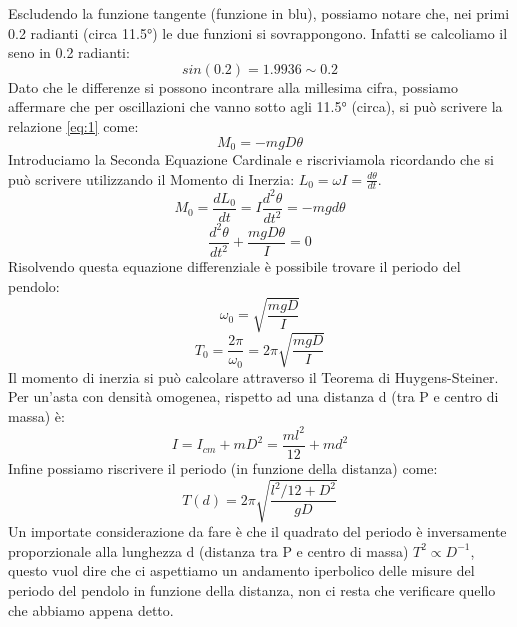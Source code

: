 \documentclass[a4paper]{article}
\begin{document}
        Escludendo la funzione tangente (funzione in blu), possiamo notare che, nei primi 0.2 radianti (circa 11.5°) le due funzioni si sovrappongono. Infatti se calcoliamo il seno in 0.2 radianti:
        \begin{equation*}
            sin(0.2) = 1.9936 \sim 0.2
        \end{equation*}
        Dato che le differenze si possono incontrare alla millesima cifra, possiamo affermare che per oscillazioni che vanno sotto agli 11.5° (circa), si può scrivere la relazione \ref{eq:1} come:
        \begin{equation*}
            M_0 = - m g D \theta
        \end{equation*}
        Introduciamo la Seconda Equazione Cardinale e riscriviamola ricordando che  si può scrivere utilizzando il Momento di Inerzia: $L_0 = \omega I = \frac{d\theta}{dt}$.
        \begin{equation*}
            M_0 = \frac{dL_0}{dt} = I \frac{d^2\theta}{dt^2} = - m g d \theta
        \end{equation*}
        \begin{equation*}
            \frac{d^2\theta}{dt^2} + \frac{m g D \theta}{I} = 0
        \end{equation*}
        Risolvendo questa equazione differenziale è possibile trovare il periodo del pendolo:
        \begin{equation*}
            \omega_0 = \sqrt{\frac{mgD}{I}}
        \end{equation*}
        \begin{equation*}
            T_0 = \frac{2\pi}{\omega_0} = 2\pi \sqrt{\frac{mgD}{I}}
        \end{equation*}
        Il momento di inerzia si può calcolare attraverso il Teorema di Huygens-Steiner. Per un'asta con densità omogenea, rispetto ad una distanza d (tra P e centro di massa) è:
        \begin{equation*}
            I = I_{cm} + m D^2 = \frac{ml^2}{12} + md^2
        \end{equation*}
        Infine possiamo riscrivere il periodo (in funzione della distanza) come:
        \begin{equation}
            T(d) = 2\pi \sqrt{\frac{l^2/12 + D^2}{gD}}
        \end{equation}
        Un importate considerazione da fare è che il quadrato del periodo è inversamente proporzionale alla lunghezza d (distanza tra P e centro di massa) $ T^2 \propto D^{-1}$, questo vuol dire che ci aspettiamo un andamento iperbolico delle misure del periodo del pendolo in funzione della distanza, non ci resta che verificare quello che abbiamo appena detto.
        
\end{document}
